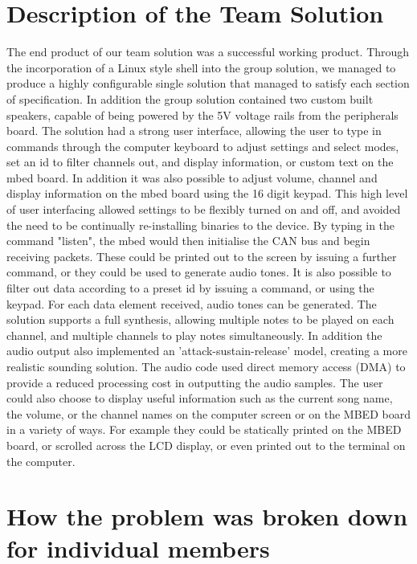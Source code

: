 \section{Description of the Team Solution}

The end product of our team solution was a successful working product. Through the 
incorporation of a Linux style shell into the group solution, we managed to produce 
a highly configurable single solution that managed to satisfy each section of 
specification. In addition the group solution contained two custom built speakers, 
capable of being powered by the 5V voltage rails from the peripherals board. 
The solution had a strong user interface, allowing the user to type in commands 
through the computer keyboard to adjust settings and select modes, set an id 
to filter channels out, and display information, or custom text on the mbed 
board. In addition it was also possible to adjust volume, channel and display 
information on the mbed board using the 16 digit keypad. This high level of 
user interfacing allowed settings to be flexibly turned on and off, and 
avoided the need to be continually re-installing binaries to the device. 
By typing in the command "listen", the mbed would then initialise the CAN bus 
and begin receiving packets. These could be printed out to the screen by issuing
a further command, or they could be used to generate audio tones. It is also 
possible to filter out data according to a preset id by issuing a command, or 
using the keypad. For each data element received, audio tones can be generated. 
The solution supports a full synthesis, allowing multiple notes to be played
on each channel, and multiple channels to play notes simultaneously. In addition 
the audio output also implemented an 'attack-sustain-release' model, creating a 
more realistic sounding solution. The audio code used direct memory access (DMA)
to provide a reduced processing cost in outputting the audio samples.
The user could also choose to display useful information such as the current 
song name, the volume, or the channel names on the computer screen or on the 
MBED board in a variety of ways. For example they could be statically printed on
the MBED board, or scrolled across the LCD display, or even printed out to 
the terminal on the computer.

\section{How the problem was broken down for individual members}

